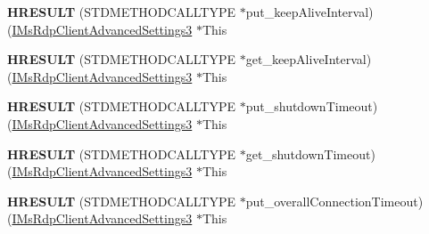 \begin{DoxyCompactItemize}
\mbox{\label{struct_m_s_t_s_c_lib_1_1_i_ms_rdp_client_advanced_settings3_vtbl_a73ef9d9cdaa54077ee553a14345c3a0b}} 
{\bfseries H\+R\+E\+S\+U\+LT} (S\+T\+D\+M\+E\+T\+H\+O\+D\+C\+A\+L\+L\+T\+Y\+PE $\ast$put\+\_\+keep\+Alive\+Interval)(\hyperlink{interface_m_s_t_s_c_lib_1_1_i_ms_rdp_client_advanced_settings3}{I\+Ms\+Rdp\+Client\+Advanced\+Settings3} $\ast$This
\item 
\mbox{\label{struct_m_s_t_s_c_lib_1_1_i_ms_rdp_client_advanced_settings3_vtbl_aa6f7a0f0d66b96023f5958da75ced050}} 
{\bfseries H\+R\+E\+S\+U\+LT} (S\+T\+D\+M\+E\+T\+H\+O\+D\+C\+A\+L\+L\+T\+Y\+PE $\ast$get\+\_\+keep\+Alive\+Interval)(\hyperlink{interface_m_s_t_s_c_lib_1_1_i_ms_rdp_client_advanced_settings3}{I\+Ms\+Rdp\+Client\+Advanced\+Settings3} $\ast$This
\item 
\mbox{\label{struct_m_s_t_s_c_lib_1_1_i_ms_rdp_client_advanced_settings3_vtbl_a1ab9bdb3be8d7def83de550f28fafbbc}} 
{\bfseries H\+R\+E\+S\+U\+LT} (S\+T\+D\+M\+E\+T\+H\+O\+D\+C\+A\+L\+L\+T\+Y\+PE $\ast$put\+\_\+shutdown\+Timeout)(\hyperlink{interface_m_s_t_s_c_lib_1_1_i_ms_rdp_client_advanced_settings3}{I\+Ms\+Rdp\+Client\+Advanced\+Settings3} $\ast$This
\item 
\mbox{\label{struct_m_s_t_s_c_lib_1_1_i_ms_rdp_client_advanced_settings3_vtbl_a4c02ae084c1b066fca468619cb87db2c}} 
{\bfseries H\+R\+E\+S\+U\+LT} (S\+T\+D\+M\+E\+T\+H\+O\+D\+C\+A\+L\+L\+T\+Y\+PE $\ast$get\+\_\+shutdown\+Timeout)(\hyperlink{interface_m_s_t_s_c_lib_1_1_i_ms_rdp_client_advanced_settings3}{I\+Ms\+Rdp\+Client\+Advanced\+Settings3} $\ast$This
\item 
\mbox{\label{struct_m_s_t_s_c_lib_1_1_i_ms_rdp_client_advanced_settings3_vtbl_a5e0ec57f3683b7b943dff391af9f94bc}} 
{\bfseries H\+R\+E\+S\+U\+LT} (S\+T\+D\+M\+E\+T\+H\+O\+D\+C\+A\+L\+L\+T\+Y\+PE $\ast$put\+\_\+overall\+Connection\+Timeout)(\hyperlink{interface_m_s_t_s_c_lib_1_1_i_ms_rdp_client_advanced_settings3}{I\+Ms\+Rdp\+Client\+Advanced\+Settings3} $\ast$This
\item 
\mbox{\label{struct_m_s_t_s_c_lib_1_1_i_ms_rdp_client_advanced_settings3_vtbl_a7e1f404f05365551f793aa3fdebea8fc}} 

\end{DoxyCompactItemize}
